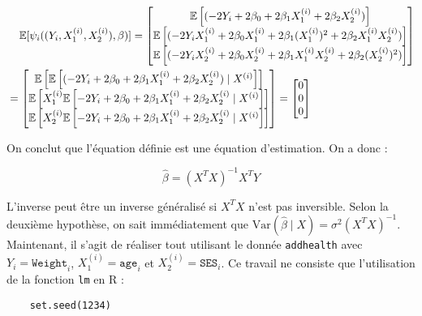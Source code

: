 \documentclass[../main.tex]{subfiles}
\begin{document}
\begin{CJK*}{UTF8}{gbsn}
\begin{equation*}
    \begin{split}
    & \tab[0.4cm] \mathbb{E} [\psi_i((Y_i, X^{(i)}_1, X^{(i)}_2), \beta)] = 
    \begin{bmatrix}
        \mathbb{E} \squared{(-2Y_i + 2\beta_0 + 2\beta_1 X^{(i)}_1 + 2\beta_2 X^{(i)}_2)} \\
        \mathbb{E} \squared{(-2Y_i X^{(i)}_1 + 2\beta_0 X^{(i)}_1 + 2\beta_1 (X^{(i)}_1)^2 + 2\beta_2 X^{(i)}_1 X^{(i)}_2)} \\
        \mathbb{E} \squared{(-2Y_i X^{(i)}_2 + 2\beta_0 X^{(i)}_2 + 2\beta_1 X^{(i)}_1 X^{(i)}_2 + 2\beta_2 (X^{(i)}_2)^2)}
    \end{bmatrix} \\ & =
    \begin{bmatrix}
        \mathbb{E} \squared{\mathbb{E} \squared{(-2Y_i + 2\beta_0 + 2\beta_1 X^{(i)}_1 + 2\beta_2 X^{(i)}_2) \mid X^{(i)}}} \\
        \mathbb{E} \squared{X^{(i)}_1\mathbb{E} \squared{-2Y_i + 2\beta_0 + 2\beta_1 X^{(i)}_1 + 2\beta_2 X^{(i)}_2 \mid X^{(i)}}} \\
        \mathbb{E} \squared{X^{(i)}_2\mathbb{E} \squared{-2Y_i + 2\beta_0 + 2\beta_1 X^{(i)}_1 + 2\beta_2 X^{(i)}_2 \mid X^{(i)}}}
    \end{bmatrix} =
    \begin{bmatrix}
        0 \\
        0 \\
        0
    \end{bmatrix}
    \end{split}
\end{equation*}

On conclut que l'équation définie est une équation d'estimation. On a donc :

\begin{equation*}
    \hat{\beta} = (X^TX)^{-1}X^TY
\end{equation*}

L'inverse peut être un inverse généralisé si $X^TX$ n'est pas inversible.
Selon la deuxième hypothèse, on sait immédiatement que $\text{Var}(\hat{\beta} \mid X) = \sigma^2 (X^TX)^{-1}$.
Maintenant, il s'agit de réaliser tout utilisant le donnée \texttt{addhealth} avec $Y_i = \texttt{Weight}_i$,
$X^{(i)}_1 = \texttt{age}_i$ et $X^{(i)}_2 = \texttt{SES}_i$.
Ce travail ne consiste que l'utilisation de la fonction \texttt{lm} en R :

\begin{lstlisting}
    set.seed(1234)


\end{lstlisting}
\end{CJK*}
\end{document}
